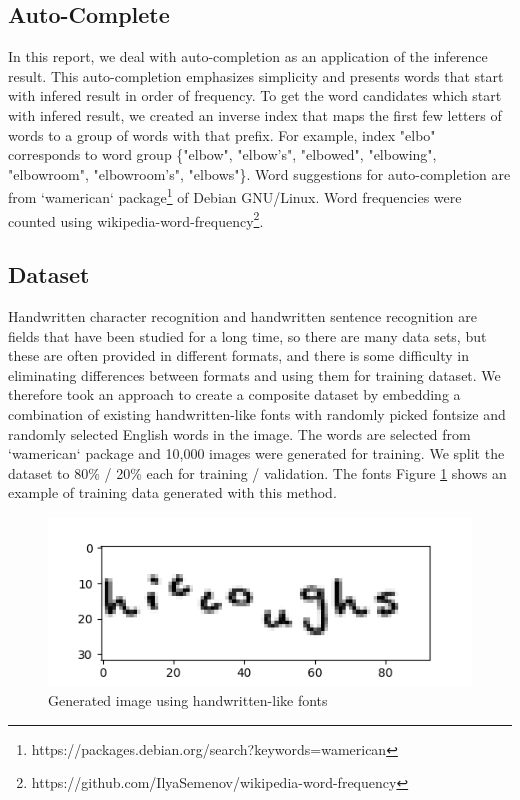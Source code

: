 \subsection{Auto-Complete}

In this report, we deal with auto-completion as an application of the inference result.
This auto-completion emphasizes simplicity and presents words
that start with infered result in order of frequency. To get the word candidates
which start with infered result, we created an inverse index
that maps the first few letters of words to a group of words with that prefix.
For example, index "elbo" corresponds to word group \{"elbow", "elbow's", "elbowed", "elbowing", "elbowroom", "elbowroom's", "elbows"\}.
Word suggestions for auto-completion are from `wamerican` package\footnote{https://packages.debian.org/search?keywords=wamerican} of Debian GNU/Linux.
Word frequencies were counted using wikipedia-word-frequency\footnote{https://github.com/IlyaSemenov/wikipedia-word-frequency}.
\subsection{Dataset}

Handwritten character recognition and handwritten sentence recognition are
fields that have been studied for a long time, so there are many data sets,
but these are often provided in different formats, and there is some difficulty
in eliminating differences between formats and using them for training dataset.
We therefore took an approach to create a composite dataset by
embedding a combination of existing handwritten-like fonts with randomly picked fontsize and
randomly selected English words in the image. The words are selected from `wamerican` package
and 10,000 images were generated for training. We split the dataset to 80\% / 20\% each for training / validation.
The fonts
Figure \ref{fig:generated_image} shows an example of training data generated with this method.

\begin{figure}
    \centering
    \includegraphics[width=\linewidth]{images/generated_image.png}
    \caption{Generated image using handwritten-like fonts}
    \label{fig:generated_image}
\end{figure}

